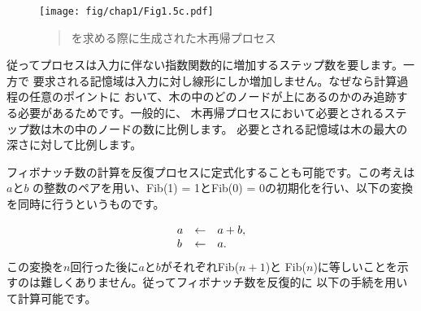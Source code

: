 \begin{figure}[tb]
\label{Figure 1.5}
\centering
\begin{comment}
\heading{Figure 1.5:} The tree-recursive process generated in computing \code{(fib 5)}.

\begin{example}

                   ..<............ fib5   <.......... 
                ...     ___________/  \___________   .  
             ...       /       . .....            \    . 
           ..       fib4     .        . . . .     fib3  .  
         ..     ____/. \____  ..             .  __/  \__  .  
       ..      /  . .  ..   \    .        ..   /  . .   \   . 
     ..     fib3 .       .  fib2 .        . fib2 .   .  fib1 .
   ..      / . \  .     .   /  \  .      .  /  \ ...  .  |  .
 ..       / . . \   .  .   /  . \   .  .   / .  \   .  . 1 .
.      fib2 . . fib1.  .fib1 .  fib0 . .fib1. . fib0 .  .  .
.      /  \  . . |  .  . |  .  . |   . . |   . . |   .   .>
V     /  . \   . 1  .  . 1  .  . 0  .  . 1  .  . 0  ..
.  fib1 .. fib0..  .   .   .   .   .   V   .   ..  . 
.   |  .  . |  . .>     .>.     . .    ..>.      .>
.   1 .   . 0  .      
 .   .     .  .       
  .>.       ..        

\end{example}
\end{comment}
\texttt{[image: fig/chap1/Fig1.5c.pdf]}
\begin{quote}
 を求める際に生成された木再帰プロセス
\end{quote}
\end{figure}

\noindent
従ってプロセスは入力に伴ない指数関数的に増加するステップ数を要します。一方で
要求される記憶域は入力に対し線形にしか増加しません。なぜなら計算過程の任意のポイントに
おいて、木の中のどのノードが上にあるのかのみ追跡する必要があるためです。一般的に、
木再帰プロセスにおいて必要とされるステップ数は木の中のノードの数に比例します。
必要とされる記憶域は木の最大の深さに対して比例します。


フィボナッチ数の計算を反復プロセスに定式化することも可能です。この考えは\( a \)と\( b \)
の整数のペアを用い、Fib(1) = 1とFib(0) = 0の初期化を行い、以下の変換を同時に行うというものです。


\begin{comment}

\begin{example}
a <- a + b
b <- a
\end{example}

\end{comment}
\begin{displaymath}
\begin{array}{l@{\quad\gets\quad}l}
  a & a + b, \\ 
  b & a.
\end{array}
\end{displaymath}
\noindent
この変換を\( n \)回行った後に\( a \)と\( b \)がそれぞれFib(\( n+1 \))と
Fib(\( n \))に等しいことを示すのは難しくありません。従ってフィボナッチ数を反復的に
以下の手続を用いて計算可能です。

